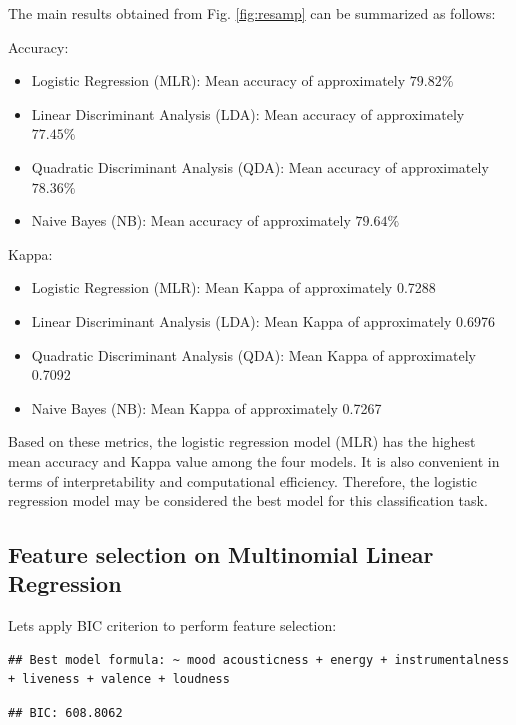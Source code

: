 \documentclass[11pt,]{article}
\providecommand{\tightlist}{%
\setlength{\itemsep}{0pt}\setlength{\parskip}{0pt}}
\begin{document}
The main results obtained from Fig. \ref{fig:resamp} can be summarized
as follows:

Accuracy:

\begin{itemize}
\tightlist
\item
  Logistic Regression (MLR): Mean accuracy of approximately \(79.82 \%\)
\item
  Linear Discriminant Analysis (LDA): Mean accuracy of approximately
  \(77.45 \%\)
\item
  Quadratic Discriminant Analysis (QDA): Mean accuracy of approximately
  \(78.36 \%\)
\item
  Naive Bayes (NB): Mean accuracy of approximately \(79.64 \%\)
\end{itemize}

Kappa:

\begin{itemize}
\tightlist
\item
  Logistic Regression (MLR): Mean Kappa of approximately 0.7288
\item
  Linear Discriminant Analysis (LDA): Mean Kappa of approximately 0.6976
\item
  Quadratic Discriminant Analysis (QDA): Mean Kappa of approximately
  0.7092
\item
  Naive Bayes (NB): Mean Kappa of approximately 0.7267
\end{itemize}

Based on these metrics, the logistic regression model (MLR) has the
highest mean accuracy and Kappa value among the four models. It is also
convenient in terms of interpretability and computational efficiency.
Therefore, the logistic regression model may be considered the best
model for this classification task.

\hypertarget{feature-selection-on-multinomial-linear-regression}{%
\subsection{Feature selection on Multinomial Linear
Regression}\label{feature-selection-on-multinomial-linear-regression}}

Lets apply BIC criterion to perform feature selection:

\begin{verbatim}
## Best model formula: ~ mood acousticness + energy + instrumentalness + liveness + valence + loudness
\end{verbatim}

\begin{verbatim}
## BIC: 608.8062
\end{verbatim}
\end{document}
